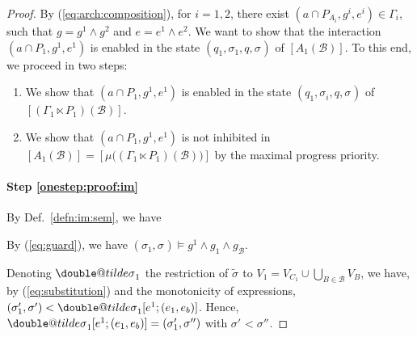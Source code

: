 \documentclass{llncs}
\makeatletter
\newcommand{\todoSB}[2][color=green!40, size=\tiny]{\todo[#1]{\textbf{To-do Simon:} {#2}}}
\newcommand{\defn}[1]{Def.~\ref{defn:#1}}
\newcommand{\eq}[1]{(\ref{eq:#1})}
\newcommand{\cB}{\ensuremath{\mathcal{B}}}
\newcommand{\goesto}[2][]{\ensuremath{\xrightarrow[{#1}\relax]{#2}}}
\newcommand{\order}{<}
\newcommand{\val}[3][]{\ensuremath{#1{\sigma}^{#2}_{#3}}}
\newcommand{\primeit}[1]{#1'}
\newcommand{\secondit}[1]{#1''}
\newcommand{\supp}[1]{\ensuremath{\mathrm{supp}(#1)}}
\newcommand{\semopen}[1]{\ensuremath{[{#1}]}}
\newcommand{\IMextend}[2]{\ensuremath{#1 \ltimes #2}}
\newcommand{\doubletilde}[1]{{%
  \mathpalette\double@tilde{#1}%
}}
\newcommand{\double@tilde}[2]{%
  \sbox\z@{$\m@th#1\tilde{#2}$}%
  \ht\z@=.9\ht\z@
  \tilde{\box\z@}%
}
\makeatother
\begin{document}
\begin{proof}
  By \eq{arch:composition}, for $i=1,2$, there exist $(a \cap P_{A_i},
  g^i, e^i) \in \Gamma_i$, such that $g = g^1 \land g^2$ and $e = e^1
  \land e^2$.
%
  We want to show that the interaction $(a \cap P_1, g^1, e^1)$ is
  enabled in the state $(q_1, \val{}{1}, q, \val{}{})$ of
  $\semopen{A_1(\cB)}$.  To this end, we proceed in two steps:
%
  \begin{enumerate}
  \item \label{onestep:proof:im} We show that $(a \cap P_1, g^1,
    e^1)$ is enabled in the state $(q_1, \val{}{i}, q, \val{}{})$ of
    $\semopen{(\IMextend{\Gamma_1}{P_1})(\cB)}$.
  \item \label{onestep:proof:maxp} We show that $(a \cap P_1, g^1,
    e^1)$ is not inhibited in $\semopen{A_1(\cB)} =
    \semopen{\mu\bigl((\IMextend{\Gamma_1}{P_1})(\cB)\bigr)}$ by the
    maximal progress priority.
  \end{enumerate}

  \paragraph*{Step \ref{onestep:proof:im}}
  By \defn{im:sem}, we have
%

  By \eq{guard}, we have
  $(\val{}{1}, \val{}{}) \models g^1 \land g_1 \land g_\cB$.

  Denoting %
  $\val[\doubletilde]{}{1}$ the restriction of
%
  $\val[\tilde]{}{}$ to
  $V_1 = V_{C_1} \cup \bigcup_{B \in \cB} V_B$,
%
  we have, by \eq{substitution} and the monotonicity of
  expressions,
%
  $(\val[\primeit]{}{1}, \val[\primeit]{}{}) \order
  \val[\doubletilde]{}{1}[e^1; (e_1, e_b)]$.  %
  Hence,
%
  $\val[\doubletilde]{}{1}[e^1; (e_1, e_b)] =
  (\val[\primeit]{}{1}, \val[\secondit]{}{})$ with 
  $\val[\primeit]{}{} \order \val[\secondit]{}{}$.


\end{proof}
\end{document}
